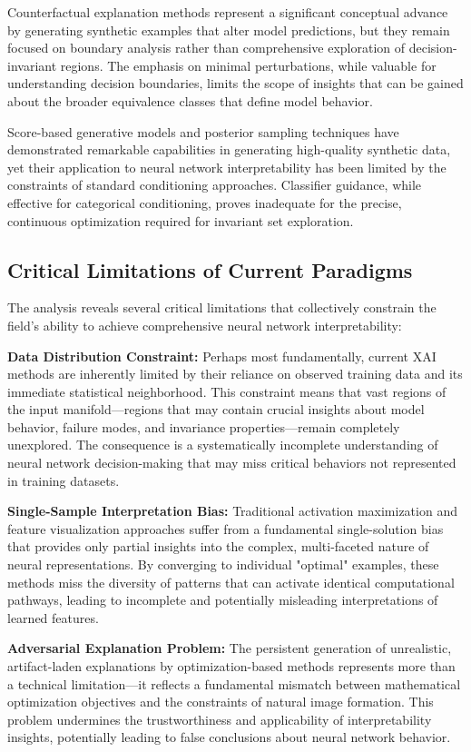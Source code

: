 Counterfactual explanation methods represent a significant conceptual advance by generating synthetic examples that alter model predictions, but they remain focused on boundary analysis rather than comprehensive exploration of decision-invariant regions. The emphasis on minimal perturbations, while valuable for understanding decision boundaries, limits the scope of insights that can be gained about the broader equivalence classes that define model behavior.

Score-based generative models and posterior sampling techniques have demonstrated remarkable capabilities in generating high-quality synthetic data, yet their application to neural network interpretability has been limited by the constraints of standard conditioning approaches. Classifier guidance, while effective for categorical conditioning, proves inadequate for the precise, continuous optimization required for invariant set exploration.

\subsection{Critical Limitations of Current Paradigms}

The analysis reveals several critical limitations that collectively constrain the field's ability to achieve comprehensive neural network interpretability:

\textbf{Data Distribution Constraint:} Perhaps most fundamentally, current XAI methods are inherently limited by their reliance on observed training data and its immediate statistical neighborhood. This constraint means that vast regions of the input manifold—regions that may contain crucial insights about model behavior, failure modes, and invariance properties—remain completely unexplored. The consequence is a systematically incomplete understanding of neural network decision-making that may miss critical behaviors not represented in training datasets.

\textbf{Single-Sample Interpretation Bias:} Traditional activation maximization and feature visualization approaches suffer from a fundamental single-solution bias that provides only partial insights into the complex, multi-faceted nature of neural representations. By converging to individual "optimal" examples, these methods miss the diversity of patterns that can activate identical computational pathways, leading to incomplete and potentially misleading interpretations of learned features.

\textbf{Adversarial Explanation Problem:} The persistent generation of unrealistic, artifact-laden explanations by optimization-based methods represents more than a technical limitation—it reflects a fundamental mismatch between mathematical optimization objectives and the constraints of natural image formation. This problem undermines the trustworthiness and applicability of interpretability insights, potentially leading to false conclusions about neural network behavior.

